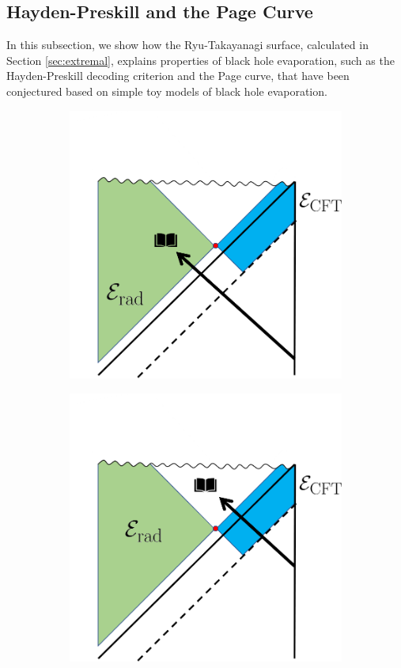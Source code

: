 \documentclass[12pt]{article}
\begin{document}
\subsection{Hayden-Preskill and the Page Curve} \label{sec:haydenpage}
In this subsection, we show how the Ryu-Takayanagi surface, calculated in Section \ref{sec:extremal}, explains properties of black hole evaporation, such as the Hayden-Preskill decoding criterion and the Page curve, that have been conjectured based on simple toy models of black hole evaporation.
\begin{figure}[t]
\vspace{-1cm}
\begin{subfigure}{.48\textwidth}
\includegraphics[width = 0.8\linewidth]{HaydenPreskill.png}
\centering
\end{subfigure}
\begin{subfigure}{.48\textwidth}
\includegraphics[width = 0.8\linewidth]{HaydenPreskillLate.png}
\centering
\end{subfigure}


\end{figure}
\end{document}
